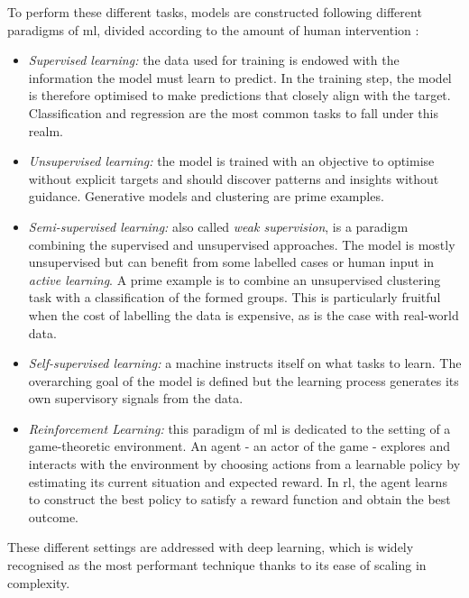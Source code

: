 To perform these different tasks, models are constructed following different paradigms of \gls{ml}, divided according to the amount of human intervention \cite{MurphyML}:
\begin{itemize}
    \item \textit{Supervised learning:} the data used for training is endowed with the information the model must learn to predict. In the training step, the model is therefore optimised to make predictions that closely align with the target. Classification and regression are the most common tasks to fall under this realm.
    \item \textit{Unsupervised learning:} the model is trained with an objective to optimise without explicit targets and should discover patterns and insights without guidance. Generative models and clustering are prime examples. 
    \item \textit{Semi-supervised learning:} also called \textit{weak supervision}, is a paradigm combining the supervised and unsupervised approaches. The model is mostly unsupervised but can benefit from some labelled cases or human input in \textit{active learning}. A prime example is to combine an unsupervised clustering task with a classification of the formed groups. This is particularly fruitful when the cost of labelling the data is expensive, as is the case with real-world data.
    \item \textit{Self-supervised learning:} a machine instructs itself on what tasks to learn. The overarching goal of the model is defined but the learning process generates its own supervisory signals from the data.
    \item \textit{Reinforcement Learning:} this paradigm of \gls{ml} is dedicated to the setting of a game-theoretic environment. An agent - an actor of the game - explores and interacts with the environment by choosing actions from a learnable policy by estimating its current situation and expected reward. In \gls{rl}, the agent learns to construct the best policy to satisfy a reward function and obtain the best outcome.
\end{itemize}
These different settings are addressed with deep learning, which is widely recognised as the most performant technique thanks to its ease of scaling in complexity.

